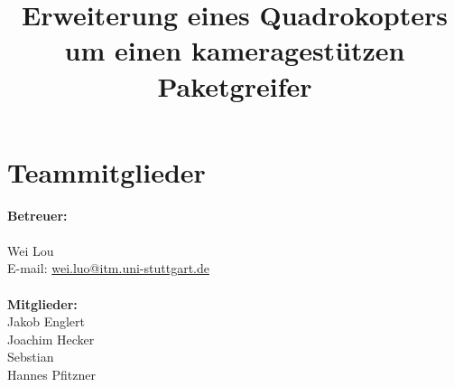 \documentclass[ngerman, 12pt, letterpaper]{article}
\title{Erweiterung eines Quadrokopters um einen kameragestützen Paketgreifer}
\begin{document}
\maketitle
\newpage

\tableofcontents
\newpage
\section{Teammitglieder}
\textbf {Betreuer:}\\
\\
 Wei Lou\\
\hfill  E-mail: \href{wei.luo@itm.uni-stuttgart.de}{wei.luo@itm.uni-stuttgart.de}\\
\\
\textbf {Mitglieder:}\\
Jakob Englert\\
Joachim Hecker\\
Sebstian\\
Hannes Pfitzner\\












\end{document}
